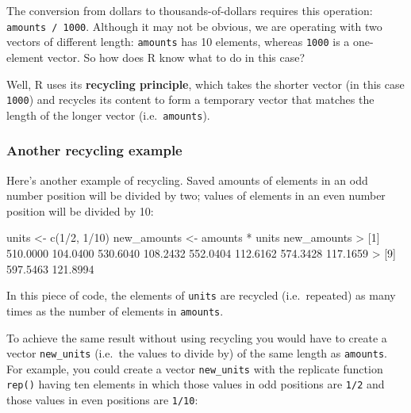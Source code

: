\documentclass[
]{book}
\newenvironment{Shaded}{\begin{snugshade}}{\end{snugshade}}
\newcommand{\DecValTok}[1]{\textcolor[rgb]{0.00,0.00,0.81}{#1}}
\newcommand{\FloatTok}[1]{\textcolor[rgb]{0.00,0.00,0.81}{#1}}
\newcommand{\FunctionTok}[1]{\textcolor[rgb]{0.00,0.00,0.00}{#1}}
\newcommand{\NormalTok}[1]{#1}
\newcommand{\OtherTok}[1]{\textcolor[rgb]{0.56,0.35,0.01}{#1}}
\newcommand{\SpecialCharTok}[1]{\textcolor[rgb]{0.00,0.00,0.00}{#1}}
\begin{document}
The conversion from dollars to thousands-of-dollars requires this operation:
\texttt{amounts\ /\ 1000}. Although it may not be obvious, we are operating with two
vectors of different length: \texttt{amounts} has 10 elements, whereas \texttt{1000} is a
one-element vector. So how does R know what to do in this case?

Well, R uses its \textbf{recycling principle}, which takes the shorter vector (in
this case \texttt{1000}) and recycles its content to form a temporary vector that
matches the length of the longer vector (i.e.~\texttt{amounts}).

\hypertarget{another-recycling-example}{%
\subsubsection*{Another recycling example}\label{another-recycling-example}}

Here's another example of recycling. Saved amounts of elements in an odd
number position will be divided by two; values of elements in an even
number position will be divided by 10:

\begin{Shaded}
\begin{Highlighting}[]
\NormalTok{units }\OtherTok{\textless{}{-}} \FunctionTok{c}\NormalTok{(}\DecValTok{1}\SpecialCharTok{/}\DecValTok{2}\NormalTok{, }\DecValTok{1}\SpecialCharTok{/}\DecValTok{10}\NormalTok{)}
\NormalTok{new\_amounts }\OtherTok{\textless{}{-}}\NormalTok{ amounts }\SpecialCharTok{*}\NormalTok{ units}
\NormalTok{new\_amounts}
\SpecialCharTok{\textgreater{}}\NormalTok{  [}\DecValTok{1}\NormalTok{] }\FloatTok{510.0000} \FloatTok{104.0400} \FloatTok{530.6040} \FloatTok{108.2432} \FloatTok{552.0404} \FloatTok{112.6162} \FloatTok{574.3428} \FloatTok{117.1659}
\SpecialCharTok{\textgreater{}}\NormalTok{  [}\DecValTok{9}\NormalTok{] }\FloatTok{597.5463} \FloatTok{121.8994}
\end{Highlighting}
\end{Shaded}

In this piece of code, the elements of \texttt{units} are recycled (i.e.~repeated) as
many times as the number of elements in \texttt{amounts}.

To achieve the same result without using recycling you would have to create a
vector \texttt{new\_units} (i.e.~the values to divide by) of the same length as \texttt{amounts}.
For example, you could create a vector \texttt{new\_units} with the replicate function
\texttt{rep()} having ten elements in which those values in odd positions are \texttt{1/2}
and those values in even positions are \texttt{1/10}:
\end{document}
